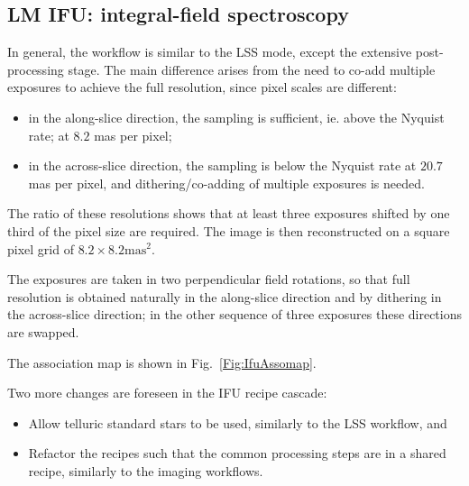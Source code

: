 \subsection{LM IFU: integral-field spectroscopy}
\label{ssec:overview_ifu}

In general, the workflow is similar to the \ac{LSS} mode,
except the extensive post-processing stage.
The main difference arises from the need to co-add multiple exposures
to achieve the full resolution, since pixel scales are different:
\begin{itemize}
    \item in the along-slice direction, the sampling is sufficient, ie. above the Nyquist rate;
        at $8.2$ mas per pixel;
    \item in the across-slice direction, the sampling is below the Nyquist rate at
        $20.7$ mas per pixel, and dithering/co-adding of multiple exposures is needed.
\end{itemize}

The ratio of these resolutions shows that at least three exposures shifted by one third of the
pixel size are required. The image is then reconstructed on a square pixel grid of
$8.2 \times 8.2 \text{mas}^2$.

The exposures are taken in two perpendicular field rotations,
so that full resolution is obtained naturally in the along-slice direction
and by dithering in the across-slice direction; in the other sequence of three exposures
these directions are swapped.

The association map is shown in Fig.~\ref{Fig:IfuAssomap}.


Two more changes are foreseen in the IFU recipe cascade:
\begin{itemize}
    \item Allow telluric standard stars to be used, similarly to the LSS workflow, and

    \item Refactor the recipes such that the common processing steps are in a shared recipe, similarly to the imaging workflows.
\end{itemize}


